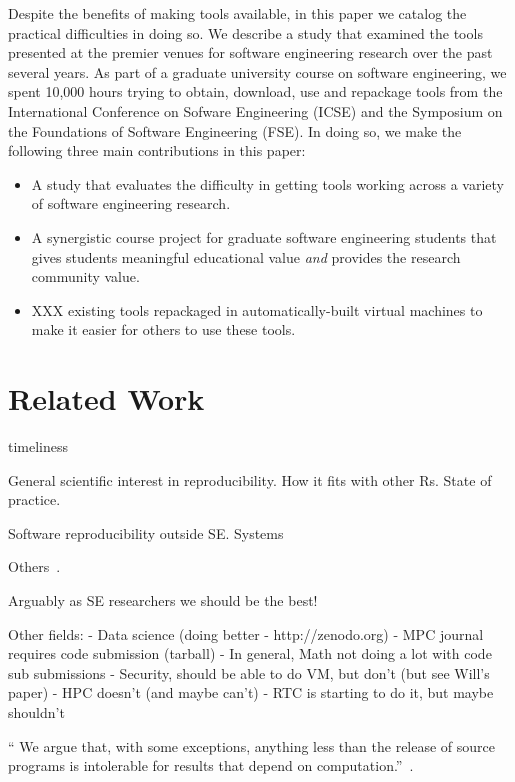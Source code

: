 \documentclass{sig-alternate-05-2015}
\begin{document}
Despite the benefits of making tools available, in this paper
we catalog the practical difficulties in doing so.
We describe a study that examined the tools presented at the 
premier venues for software engineering research over the 
past several years.
As part of a graduate university course on software engineering, 
we spent 10,000 hours trying to obtain, download, use
and repackage tools from the International Conference
on Sofware Engineering (ICSE) and the Symposium on the Foundations
of Software Engineering (FSE).
In doing so, we make the following three main 
contributions in this paper:

\begin{itemize}
  \item A study that evaluates the difficulty in getting tools 
  		working across a variety of software engineering research.
  \item A synergistic course project for graduate software engineering students 
		that gives students meaningful educational value \emph{and}
		provides the research community value.
  \item XXX existing tools repackaged in automatically-built virtual machines
  		to make it easier for others to use these tools.
\end{itemize}

\section{Related Work}

timeliness

General scientific interest in reproducibility.
How it fits with other Rs.
State of practice.

Software reproducibility outside SE.
Systems~\cite{collberg2016repeatability,proebsting2015repeatability}

Others~\cite{kovacevic2007encourage,vandewalle2009reproducible,stodden2009enabling,klein2012run}.


Arguably as SE researchers we should be the best!

Other fields:
- Data science (doing better - http://zenodo.org)
- MPC journal requires code submission (tarball)
- In general, Math not doing a lot with code sub submissions
- Security, should be able to do VM, but don't (but see Will's paper)
- HPC doesn't (and maybe can't)
- RTC is starting to do it, but maybe shouldn't

`` We argue that, with some exceptions, anything less than the release of source programs is intolerable for results that depend on computation.''~\cite{ince2012case}.
\end{document}
